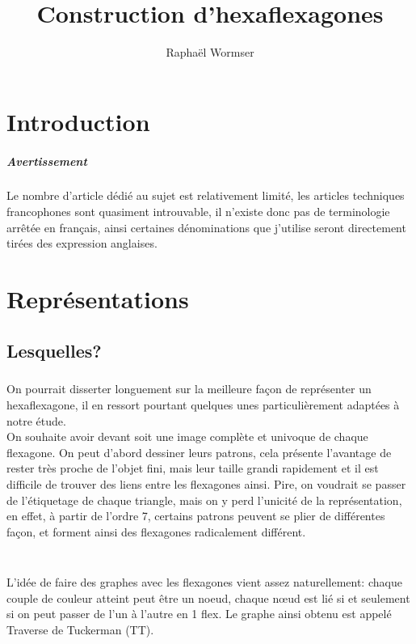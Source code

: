 \documentclass[11pt,a4paper]{report}
\author{Raphaël Wormser}
\title{Construction d'hexaflexagones}
\begin{document}
	\maketitle
	\titlepage
	
	\tableofcontents
	
	\chapter{Introduction}
		\paragraph{Avertissement}
		Le nombre d'article dédié au sujet est relativement limité, les articles techniques francophones sont quasiment introuvable, il n'existe donc pas de terminologie arrêtée en français, ainsi certaines dénominations que j'utilise seront directement tirées des expression anglaises.
				
	
	
	
	\chapter{Représentations}
	\section{Lesquelles?}
	\paragraph{}
	On pourrait disserter longuement sur la meilleure façon de représenter un hexaflexagone, il en ressort pourtant quelques unes particulièrement adaptées à notre étude.\\
	On souhaite avoir devant soit une image complète et univoque de chaque flexagone. On peut d'abord dessiner leurs patrons, cela présente l'avantage de rester très proche de l'objet fini, mais leur taille grandi rapidement et il est difficile de trouver des liens entre les flexagones ainsi. Pire, on voudrait se passer de l'étiquetage de chaque triangle, mais on y perd l'unicité de la représentation, en effet, à partir de l'ordre 7, certains patrons peuvent se plier de différentes façon, et forment ainsi des flexagones radicalement différent.\\\\
	\paragraph{}
	L'idée de faire des graphes avec les flexagones vient assez naturellement: chaque couple de couleur atteint peut être un noeud, chaque nœud est lié si et seulement si on peut passer de l'un à l'autre en 1 flex. Le graphe ainsi obtenu est appelé Traverse de Tuckerman (TT).
	
\end{document}
